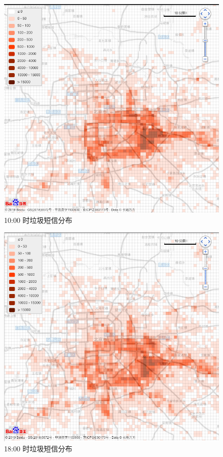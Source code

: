 \documentclass[12pt,a4paper]{article}
\begin{document}
\begin{itemize}
	\begin{flushleft}
		\begin{figure}[H]
			\centering
				\includegraphics[width=\linewidth]{10.png}
				\caption{10:00 时垃圾短信分布}
		\end{figure}
	\end{flushleft}

	\begin{flushleft}
		\begin{figure}[H]
			\centering
				\includegraphics[width=\linewidth]{18.png}
				\caption{18:00 时垃圾短信分布}
		\end{figure}
	\end{flushleft}


\end{itemize}
\end{document}
